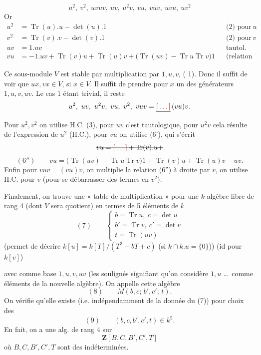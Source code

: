 \documentclass[11pt,a4paper]{article}
\begin{document}
\[
u^2,\ v^2,\ uvuv,\ uv,\ u^2v,\ vu,\ vuv,\ uvu,\ uv^2
\]
Or
\[
\begin{aligned}
u^2 &= \operatorname{Tr}(u).u - \det(u).1 && \text{(2) pour } u\\
v^2 &= \operatorname{Tr}(v).v - \det(v).1 && \text{(2) pour } v\\
uv &= 1.uv && \text{tautol.}\\
vu &= -1.uv + \operatorname{Tr}(v)u + \operatorname{Tr}(u)v + \bigl(\operatorname{Tr}(uv) - \operatorname{Tr} u \operatorname{Tr} v\bigr)1 && \text{(relation (6'))}
\end{aligned}
\]

Ce sous-module $V$ est stable par multiplication  par $1, u, v$,  (   1). Donc il suffit de voir que $ux, vx \in V$, si $x \in V$. Il suffit de prendre pour $x$ un des générateurs $1, u, v, uv$. Le cas $1$ étant trivial, il reste
\[
u^2,\ uv,\ u^2v,\ vu,\ v^2,\ vuv = \struck{\ill{}}\,(vu)v .
\]
Pour $u^2, v^2$ on utilise H.C. (3), pour $uv$ c'est tautologique, pour $u^2v$ cela résulte de l'expression de $u^2$ (H.C.), pour $vu$ on utilise (6'), qui s'écrit
\[
\text{\struck{$vu = \ill{} + \operatorname{Tr}(v).u +$}}
\]
\[
(6'')\qquad vu = \bigl(\operatorname{Tr}(uv) - \operatorname{Tr} u \operatorname{Tr} v\bigr)1 + \operatorname{Tr}(v)u + \operatorname{Tr}(u)v - uv .
\]
Enfin pour \struck{\ill{}} $vuv = (vu)v$, on multiplie la relation (6'') à droite par $v$, on utilise H.C. pour $v$ (pour se débarrasser des termes en $v^2$).

Finalement, on trouve une « table de multiplication » pour une $k$-algèbre libre de rang 4 (dont $V$ sera quotient) en termes de 5 éléments de $k$
\[
(7)\qquad \begin{cases} b = \operatorname{Tr} u,\ c = \det u \\ b' = \operatorname{Tr} v,\ c' = \det v \\ t = \operatorname{Tr}(uv) \end{cases}
\]
(permet de décrire $k[u] = k[T]/(T^2 - bT + c)$ (si $k \cap k.u = \{0\}$)) (id pour $k[v]$)

avec comme base $1, u, v, uv$ (les soulignés signifiant qu'on considère $1, u$ \ldots\ comme éléments de la nouvelle algèbre). On appelle cette algèbre
\[
(8)\qquad M(b, c;\, b', c';\, t) .
\]
On vérifie qu'elle existe (i.e. indépendamment de la donnée du (7)) pour \struck{\ill{}} choix des 
\[
(9)\qquad (b, c, b', c', t) \in k^5 .
\]
En fait, on a une alg.  de rang 4 sur
\[
\mathbf{Z}[B, C, B', C', T]
\]
où $B, C, B', C', T$ sont des indéterminées.
\end{document}
